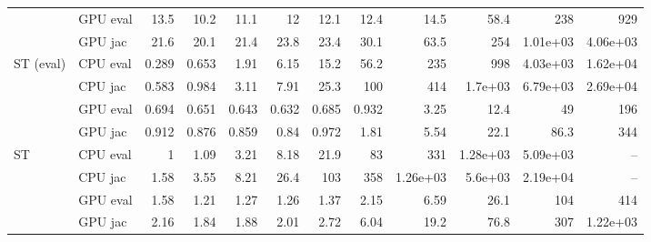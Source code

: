 \begin{tabular}{llrrrrrrrrrr}
 & GPU eval & 13.5 & 10.2 & 11.1 & 12 & 12.1 & 12.4 & 14.5 & 58.4 & 238 & 929 \\
 & GPU jac & 21.6 & 20.1 & 21.4 & 23.8 & 23.4 & 30.1 & 63.5 & 254 & 1.01e+03 & 4.06e+03 \\
\hline
ST (eval) & CPU eval & 0.289 & 0.653 & 1.91 & 6.15 & 15.2 & 56.2 & 235 & 998 & 4.03e+03 & 1.62e+04 \\
 & CPU jac & 0.583 & 0.984 & 3.11 & 7.91 & 25.3 & 100 & 414 & 1.7e+03 & 6.79e+03 & 2.69e+04 \\
 & GPU eval & 0.694 & 0.651 & 0.643 & 0.632 & 0.685 & 0.932 & 3.25 & 12.4 & 49 & 196 \\
 & GPU jac & 0.912 & 0.876 & 0.859 & 0.84 & 0.972 & 1.81 & 5.54 & 22.1 & 86.3 & 344 \\
\hline
ST & CPU eval & 1 & 1.09 & 3.21 & 8.18 & 21.9 & 83 & 331 & 1.28e+03 & 5.09e+03 & -- \\
 & CPU jac & 1.58 & 3.55 & 8.21 & 26.4 & 103 & 358 & 1.26e+03 & 5.6e+03 & 2.19e+04 & -- \\
 & GPU eval & 1.58 & 1.21 & 1.27 & 1.26 & 1.37 & 2.15 & 6.59 & 26.1 & 104 & 414 \\
 & GPU jac & 2.16 & 1.84 & 1.88 & 2.01 & 2.72 & 6.04 & 19.2 & 76.8 & 307 & 1.22e+03 \\
\hline
\end{tabular}

